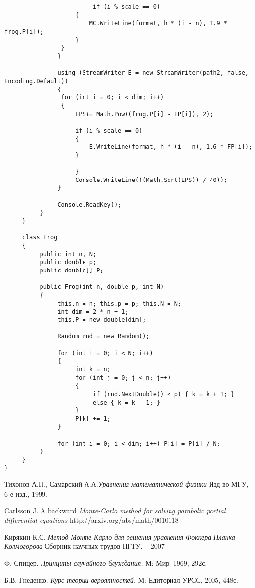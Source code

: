 \documentclass[a4paper]{report}
\begin{document}
\begin{lstlisting}
                         if (i % scale == 0)
                    {
                        MC.WriteLine(format, h * (i - n), 1.9 * frog.P[i]);
                    }
                }
               }

               using (StreamWriter E = new StreamWriter(path2, false, Encoding.Default))
               {
                for (int i = 0; i < dim; i++)
                {
                    EPS+= Math.Pow((frog.P[i] - FP[i]), 2);

                    if (i % scale == 0)
                    {
                        E.WriteLine(format, h * (i - n), 1.6 * FP[i]);
                    }

                    }
                    Console.WriteLine(((Math.Sqrt(EPS)) / 40));
               }

               Console.ReadKey();
          }
     }

     class Frog
     {
          public int n, N;
          public double p;
          public double[] P;

          public Frog(int n, double p, int N)
          {
               this.n = n; this.p = p; this.N = N;
               int dim = 2 * n + 1;
               this.P = new double[dim];

               Random rnd = new Random();

               for (int i = 0; i < N; i++)
               {
                    int k = n;
                    for (int j = 0; j < n; j++)
                    {
                         if (rnd.NextDouble() < p) { k = k + 1; }
                         else { k = k - 1; }
                    }
                    P[k] += 1;
               }

               for (int i = 0; i < dim; i++) P[i] = P[i] / N;
          }
     }
}
\end{lstlisting}




\newpage
{}


\begin{thebibliography}{99}

Тихонов А.Н., Самарский А.А.\textit {Уравнения математической физики} 
Изд-во МГУ, 6-е изд., 1999.

Carlsson J. A backward \textit {Monte-Carlo method for solving parabolic partial
differential equations}
http://arxiv.org/abs/math/0010118

Кирякин К.С. \textit {Метод Монте-Карло для решения уравнения Фоккера-Планка-Колмогорова}
Сборник научных трудов НГТУ. – 2007

Ф. Спицер.
\textit{Принципы случайного блуждания.} М: Мир, 1969, 292с.

Б.В. Гнеденко. \textit{Курс теории вероятностей.}
М: Едиториал УРСС, 2005, 448с.


\end{thebibliography}
\end{document}
